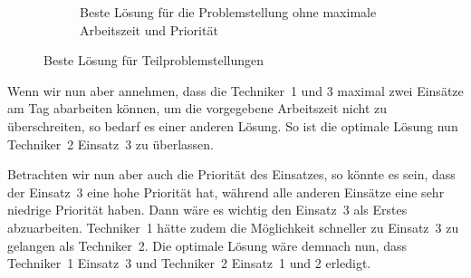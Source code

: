 \documentclass[a4paper,notitlepage,12pt]{report}
\begin{document}
\begin{figure}[H]
\begin{center}
\begin{subfigure}[b]{0.45\linewidth}
            \caption{Beste Lösung für die Problemstellung ohne maximale Arbeitszeit und Priorität}
        \end{subfigure}
    \end{center}
    \caption{Beste Lösung für Teilproblemstellungen}
\end{figure}

Wenn wir nun aber annehmen, dass die Techniker 1 und 3 maximal zwei Einsätze am Tag
abarbeiten können, um die vorgegebene Arbeitszeit nicht zu überschreiten, so bedarf es
einer anderen Lösung. So ist die optimale Lösung nun Techniker 2 Einsatz 3 zu überlassen.


Betrachten wir nun aber auch die Priorität des Einsatzes, so könnte es sein, dass
der Einsatz 3 eine hohe Priorität hat, während alle anderen Einsätze eine sehr niedrige
Priorität haben. Dann wäre es wichtig den Einsatz 3 als Erstes abzuarbeiten. Techniker 1
hätte zudem die Möglichkeit schneller zu Einsatz 3 zu gelangen als Techniker 2. Die
optimale Lösung wäre demnach nun, dass Techniker 1 Einsatz 3 und Techniker 2 Einsatz 1
und 2 erledigt.
\end{document}
